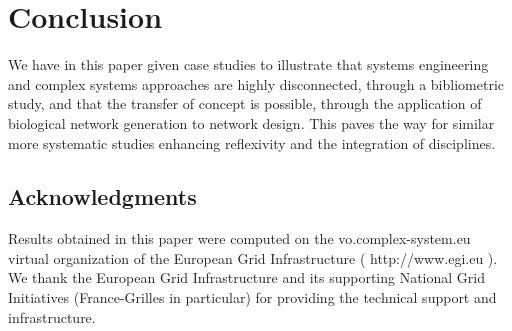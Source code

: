 \documentclass[runningheads,a4paper]{llncs2e/llncs}
\begin{document}
\section{Conclusion}

We have in this paper given case studies to illustrate that systems engineering and complex systems approaches are highly disconnected, through a bibliometric study, and that the transfer of concept is possible, through the application of biological network generation to network design. This paves the way for similar more systematic studies enhancing reflexivity and the integration of disciplines.



\subsection*{Acknowledgments}

\footnotesize
Results obtained in this paper were computed on the vo.complex-system.eu virtual organization of the European Grid Infrastructure ( http://www.egi.eu ). We thank the European Grid Infrastructure and its supporting National Grid Initiatives (France-Grilles in particular) for providing the technical support and infrastructure.





%
\end{document}
